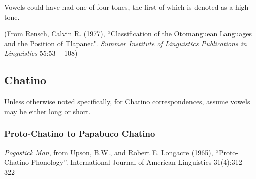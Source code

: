 \documentclass[11pt]{article}
\newcommand{\tab}{\hspace{25pt}}
\begin{document}
\tab Vowels could have had one of four tones, the first of which is denoted as a high tone.

\tab (From Rensch, Calvin R. (1977), ``Classification of the Otomanguean Languages and the Position of Tlapanec". {\it Summer Institute of Linguistics Publications in Linguistics} 55:53 -- 108) %

\subsection{Chatino}\tab Unless otherwise noted specifically, for Chatino correspondences, assume vowels may be either long or short.

\subsubsection{Proto-Chatino to Papabuco Chatino}{\it Pogostick Man}, from Upson, B.W., and Robert E. Longacre (1965), ``Proto-Chatino Phonology''. International Journal of American Linguistics 31(4):312 -- 322
\end{document}
